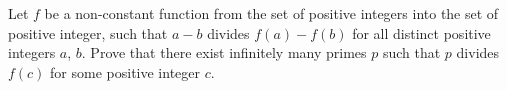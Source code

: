 Let $f$ be a non-constant function from the set of positive integers into the set of positive integer, such that $a-b$ divides $f(a)-f(b)$ for all distinct positive integers $a$,  $b$. Prove that there exist infinitely many primes $p$ such that $p$ divides $f(c)$ for some positive integer $c$.
